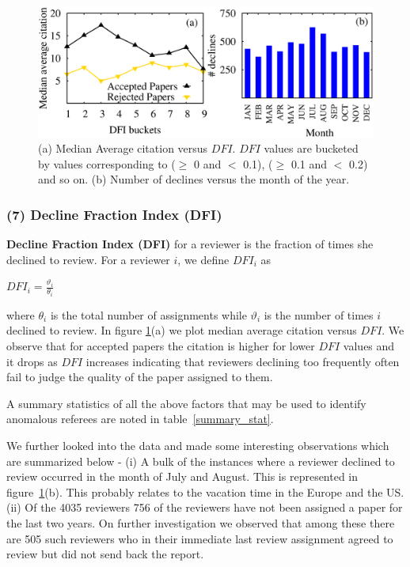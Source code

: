 \begin{figure}
\centering
\includegraphics[scale=0.3]{./texfiles/Chapter_4/cikm/figures/DFI_dec_month.eps}
\caption{\label{fig_dfi}(a) Median Average citation versus $DFI$. $DFI$ values are bucketed by values corresponding to ($\geq$ 0 and $<$ 0.1), ($\geq$ 0.1 and $<$ 0.2) and so on. (b) Number of declines versus the month of the year.}
\vspace{3mm}
\end{figure}

\subsubsection*{(7) Decline Fraction Index (DFI)}

{\bf Decline Fraction Index (DFI)} for a reviewer is the fraction of times she declined to review. For a reviewer $i$, we define $DFI_{i}$ as
\begin{center}
$DFI_{i}=\frac{\vartheta_{i}}{\theta_{i}}$
\end{center}

\noindent where $\theta_{i}$ is the total number of assignments while $\vartheta_{i}$ is the number of times $i$ declined to review. 
In figure \ref{fig_dfi}(a) we plot median average citation versus $DFI$. We observe that for accepted papers the citation is higher for lower $DFI$ values and it drops as $DFI$ increases indicating that reviewers declining too frequently often fail to judge the quality of the paper assigned to them.

A summary statistics of all the above factors that may be used to identify anomalous referees are noted in table~\ref{summary_stat}.

We further looked into the data and made some interesting observations which are summarized below - 
(i) A bulk of the instances where a reviewer declined to review occurred in the month of July and August. This is represented in figure~\ref{fig_dfi}(b). This probably relates to the vacation time in the Europe and the US. 
(ii) Of the 4035 reviewers 756 of the reviewers have not been assigned a paper for the last two years. On further investigation we observed that among these there are 505 such reviewers who in their immediate last review assignment agreed to review but did not send back the report. 